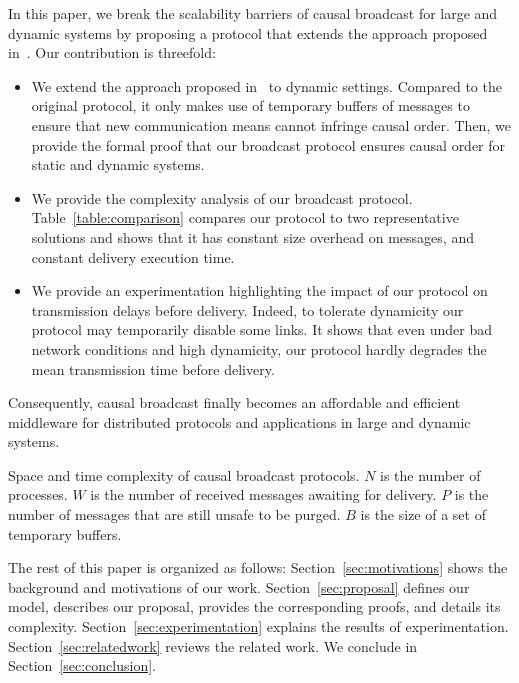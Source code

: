 In this paper, we break the scalability barriers of causal broadcast for large
and dynamic systems by proposing a protocol that extends the approach proposed
in~\cite{friedman2004causal}.  Our contribution is threefold:
\begin{itemize}[leftmargin=*]
\item We extend the approach proposed in~\cite{friedman2004causal} to dynamic
  settings. Compared to the original protocol, it only makes use of temporary
  buffers of messages to ensure that new communication means cannot infringe
  causal order.  Then, we provide the formal proof that our broadcast protocol
  ensures causal order for static and dynamic systems.
\item We provide the complexity analysis of our broadcast
  protocol. Table~\ref{table:comparison} compares our protocol to two
  representative solutions and shows that it has constant size overhead on
  messages, and constant delivery execution time.
\item We provide an experimentation highlighting the impact of our protocol on
  transmission delays before delivery. Indeed, to tolerate dynamicity our
  protocol may temporarily disable some links.  It shows that even under bad
  network conditions and high dynamicity, our protocol hardly degrades
  the mean transmission time before delivery.
\end{itemize}
Consequently, causal broadcast finally becomes an affordable and efficient
middleware for distributed protocols and applications in large and dynamic
systems.

\begin{table}
  \caption{\label{table:comparison} Space and time complexity of causal
    broadcast protocols. 
    $N$ is the number of processes. 
    $W$ is the number of received messages awaiting for delivery.
    $P$ is the number of messages that are still unsafe to be purged.
    $B$ is the size of a set of temporary buffers.}
  
\end{table}

The rest of this paper is organized as follows: Section~\ref{sec:motivations}
shows the background and motivations of our work. Section~\ref{sec:proposal}
defines our model, describes our proposal, provides the corresponding proofs,
and details its complexity. Section~\ref{sec:experimentation} explains the
results of experimentation.  Section~\ref{sec:relatedwork} reviews the related
work. We conclude in Section~\ref{sec:conclusion}.

